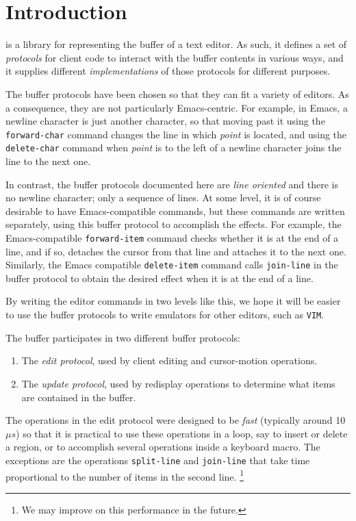 \chapter{Introduction}

\sysname{} is a library for representing the buffer of a text editor.
As such, it defines a set of \clos{} \emph{protocols} for client code
to interact with the buffer contents in various ways, and it supplies
different \emph{implementations} of those protocols for different
purposes.

The buffer protocols have been chosen so that they can fit a variety
of editors.  As a consequence, they are not particularly
Emacs-centric.  For example, in Emacs, a newline character is just
another character, so that moving past it using the
\texttt{forward-char} command changes the line in which \emph{point}
is located, and using the \texttt{delete-char} command when
\emph{point} is to the left of a newline character joins the line to
the next one.

In contrast, the buffer protocols documented here are \emph{line
  oriented} and there is no newline character; only a sequence of
lines.  At some level, it is of course desirable to have
Emacs-compatible commands, but these commands are written separately,
using this buffer protocol to accomplish the effects.  For example,
the Emacs-compatible \texttt{forward-item} command checks whether it
is at the end of a line, and if so, detaches the cursor from that line
and attaches it to the next one.  Similarly, the Emacs compatible
\texttt{delete-item} command calls \texttt{join-line} in the buffer
protocol to obtain the desired effect when it is at the end of a line.

By writing the editor commands in two levels like this, we hope it
will be easier to use the buffer protocols to write emulators for
other editors, such as \texttt{VIM}.

The buffer participates in two different buffer protocols:

\begin{enumerate}
\item The \emph{edit protocol}, used by client editing and
  cursor-motion operations.
\item The \emph{update protocol}, used by redisplay operations to
  determine what items are contained in the buffer.
\end{enumerate}

The operations in the edit protocol were designed to be \emph{fast}
(typically around 10 $\mu s$) so that it is practical to use these
operations in a loop, say to insert or delete a region, or to
accomplish several operations inside a keyboard macro.  The exceptions
are the operations \texttt{split-line} and \texttt{join-line} that
take time proportional to the number of items in the second line.%
\footnote{We may improve on this performance in the future.}

